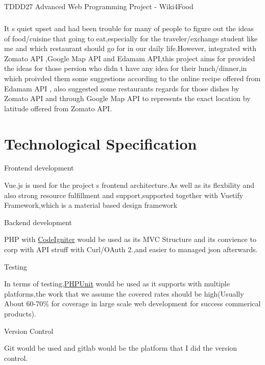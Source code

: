 T\+D\+D\+D27 Advanced Web Programming Project -\/ Wiki4\+Food \subparagraph*{}

It \textquotesingle{}s quiet upset and had been trouble for many of people to figure out the ideas of food/cuisine that going to eat,especially for the traveler/exchange student like me and which restaurant should go for in our daily life.\+However, integrated with Zomato A\+PI ,Google Map A\+PI and Edamam A\+PI,this project aims for provided the ideas for those persion who didn \textquotesingle{}t have any idea for their lunch/dinner,in which proivded them some suggestions according to the online recipe offered from Edamam A\+PI , also suggested some restaurants regards for those dishes by Zomato A\+PI and through Google Map A\+PI to represents the exact location by latitude offered from Zomato A\+PI.

\section*{Technological Specification }



 Frontend development 



Vue.\+js is used for the project \textquotesingle{}s frontend architecture.\+As well as its flexbility and also strong resource fulfillment and support,supported together with Vuetify Framework,which is a material based design framework



 Backend development 



P\+HP with \mbox{\hyperlink{namespace_code_igniter}{Code\+Igniter}} would be used as its M\+VC Structure and its convience to corp with A\+PI struff with Curl/\+O\+Auth 2.,and easier to managed json afterwards.



 Testing 



In terms of testing,\mbox{\hyperlink{namespace_p_h_p_unit}{P\+H\+P\+Unit}} would be used as it supports with multiple platforms,the work that we assume the covered rates should be high(Usually About 60-\/70\% for coverage in large scale web development for success commerical products).



 Version Control 



Git would be used and gitlab would be the platform that I did the version control.



